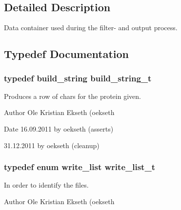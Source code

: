 \subsection{Detailed Description}
Data container used during the filter-\/ and output process. 

\subsection{Typedef Documentation}
\hypertarget{group__filter__container_gac5f932c8e1e900105f8154bf8d07d599}{
\subsubsection[{build\_\-string\_\-t}]{\setlength{\rightskip}{0pt plus 5cm}typedef {\bf build\_\-string} {\bf build\_\-string\_\-t}}}
\label{group__filter__container_gac5f932c8e1e900105f8154bf8d07d599}


Produces a row of chars for the protein given. 

\begin{DoxyAuthor}{Author}
Ole Kristian Ekseth (oekseth 
\end{DoxyAuthor}
\begin{DoxyDate}{Date}
16.09.2011 by oekseth (asserts) 

31.12.2011 by oekseth (cleanup) 
\end{DoxyDate}
\hypertarget{group__filter__container_ga2e624181c20dfdcd672e236540620248}{
\subsubsection[{write\_\-list\_\-t}]{\setlength{\rightskip}{0pt plus 5cm}typedef enum {\bf write\_\-list} {\bf write\_\-list\_\-t}}}
\label{group__filter__container_ga2e624181c20dfdcd672e236540620248}


In order to identify the files. 

\begin{DoxyAuthor}{Author}
Ole Kristian Ekseth (oekseth 
\end{DoxyAuthor}


